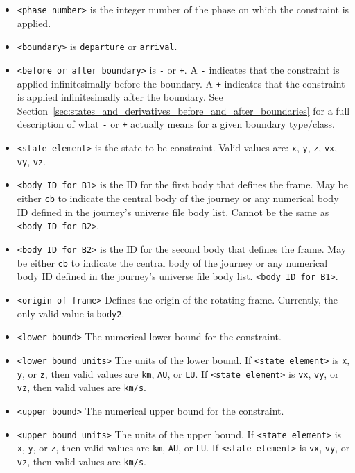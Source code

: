 \documentclass[11pt]{article}
\begin{document}
\begin{itemize}
	\item \texttt{<phase number>} is the integer number of the phase on which the constraint is applied.
	\item \texttt{<boundary>} is \texttt{departure} or \texttt{arrival}.
	\item \texttt{<before or after boundary>} is \texttt{-} or \texttt{+}. A \texttt{-} indicates that the constraint is applied infinitesimally before the boundary. A \texttt{+} indicates that the constraint is applied infinitesimally after the boundary. See Section~\ref{sec:states_and_derivatives_before_and_after_boundaries} for a full description of what \texttt{-} or \texttt{+} actually means for a given boundary type/class.
	\item \texttt{<state element>} is the state to be constraint. Valid values are: \texttt{x}, \texttt{y}, \texttt{z}, \texttt{vx}, \texttt{vy}, \texttt{vz}.
	\item \texttt{<body ID for B1>} is the ID for the first body that defines the frame. May be either \texttt{cb} to indicate the central body of the journey or any numerical body ID defined in the journey's universe file body list. Cannot be the same as \texttt{<body ID for B2>}.
	\item \texttt{<body ID for B2>} is the ID for the second body that defines the frame. May be either \texttt{cb} to indicate the central body of the journey or any numerical body ID defined in the journey's universe file body list. \texttt{<body ID for B1>}.
	\item \texttt{<origin of frame>} Defines the origin of the rotating frame. Currently, the only valid value is \texttt{body2}.
	\item \texttt{<lower bound>} The numerical lower bound for the constraint.
	\item \texttt{<lower bound units>} The units of the lower bound. If \texttt{<state element>} is \texttt{x}, \texttt{y}, or \texttt{z}, then valid values are \texttt{km}, \texttt{AU}, or \texttt{LU}. If \texttt{<state element>} is \texttt{vx}, \texttt{vy}, or \texttt{vz}, then valid values are \texttt{km/s}.
	\item \texttt{<upper bound>} The numerical upper bound for the constraint.
	\item \texttt{<upper bound units>} The units of the upper bound. If \texttt{<state element>} is \texttt{x}, \texttt{y}, or \texttt{z}, then valid values are \texttt{km}, \texttt{AU}, or \texttt{LU}. If \texttt{<state element>} is \texttt{vx}, \texttt{vy}, or \texttt{vz}, then valid values are \texttt{km/s}.
\end{itemize}
\end{document}
